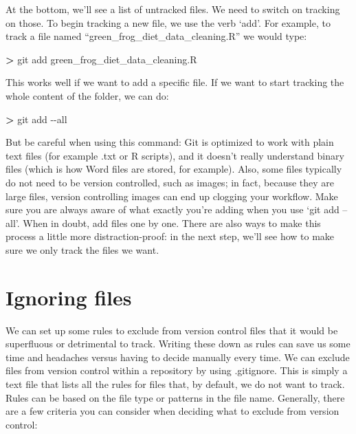 \documentclass[
]{book}
\newenvironment{Shaded}{\begin{snugshade}}{\end{snugshade}}
\newcommand{\AttributeTok}[1]{\textcolor[rgb]{0.13,0.29,0.53}{#1}}
\newcommand{\ExtensionTok}[1]{#1}
\newcommand{\NormalTok}[1]{#1}
\newcommand{\OperatorTok}[1]{\textcolor[rgb]{0.81,0.36,0.00}{\textbf{#1}}}
\begin{document}
At the bottom, we'll see a list of untracked files. We need to switch on tracking on those. To begin tracking a new file, we use the verb `add'. For example, to track a file named ``green\_frog\_diet\_data\_cleaning.R'' we would type:

\begin{Shaded}
\begin{Highlighting}[]
\OperatorTok{\textgreater{}}\NormalTok{ git }\ExtensionTok{add}\NormalTok{ green\_frog\_diet\_data\_cleaning.R}
\end{Highlighting}
\end{Shaded}

This works well if we want to add a specific file. If we want to start tracking the whole content of the folder, we can do:

\begin{Shaded}
\begin{Highlighting}[]
\OperatorTok{\textgreater{}}\NormalTok{ git }\ExtensionTok{add} \AttributeTok{{-}{-}all}
\end{Highlighting}
\end{Shaded}

But be careful when using this command: Git is optimized to work with plain text files (for example .txt or R scripts), and it doesn't really understand binary files (which is how Word files are stored, for example). Also, some files typically do not need to be version controlled, such as images; in fact, because they are large files, version controlling images can end up clogging your workflow. Make sure you are always aware of what exactly you're adding when you use `git add --all'. When in doubt, add files one by one. There are also ways to make this process a little more distraction-proof: in the next step, we'll see how to make sure we only track the files we want.

\hypertarget{ignoring-files}{%
\section{Ignoring files}\label{ignoring-files}}

We can set up some rules to exclude from version control files that it would be superfluous or detrimental to track. Writing these down as rules can save us some time and headaches versus having to decide manually every time. We can exclude files from version control within a repository by using .gitignore. This is simply a text file that lists all the rules for files that, by default, we do not want to track. Rules can be based on the file type or patterns in the file name. Generally, there are a few criteria you can consider when deciding what to exclude from version control:
\end{document}
